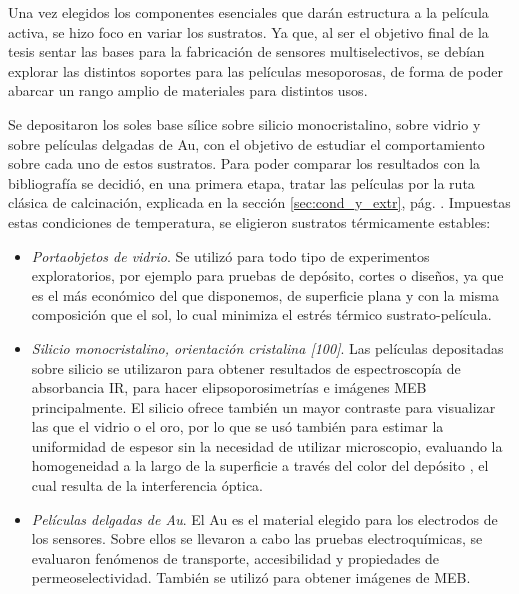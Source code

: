 	Una vez elegidos los componentes esenciales que darán estructura a la película activa, se hizo foco en variar los sustratos. Ya que, al ser el objetivo final de la tesis sentar las bases para la fabricación de sensores multiselectivos, se debían explorar las distintos soportes para las películas mesoporosas, de forma de poder abarcar un rango amplio de materiales para distintos usos.

	Se depositaron los soles base sílice sobre silicio monocristalino, sobre vidrio y sobre películas delgadas de Au, con el objetivo de estudiar el comportamiento sobre cada uno de estos sustratos. Para poder comparar los resultados con la bibliografía\cite{Soler-Illia2006,Brinker1990} se decidió, en una primera etapa, tratar las películas por la ruta clásica de calcinación, explicada en la sección \ref{sec:cond_y_extr}, pág. \pageref{sec:cond_y_extr}. Impuestas estas condiciones de temperatura, se eligieron sustratos térmicamente estables:

		\begin{itemize}

			\item \textit{Portaobjetos de vidrio}. Se utilizó para todo tipo de experimentos exploratorios, por ejemplo para pruebas de depósito, cortes o diseños, ya que es el más económico del que disponemos, de superficie plana y con la misma composición que el sol, lo cual minimiza el estrés térmico sustrato-película.

			\item \textit{Silicio monocristalino, orientación cristalina [100]}. Las películas depositadas sobre silicio se utilizaron para obtener resultados de espectroscopía de absorbancia IR, para hacer elipsoporosimetrías e imágenes MEB principalmente. El silicio ofrece también un mayor contraste para visualizar las \pdm\space que el vidrio o el oro, por lo que se usó también para estimar la uniformidad de espesor sin la necesidad de utilizar microscopio, evaluando la homogeneidad a la largo de la superficie a través del color del depósito , el cual resulta de la interferencia óptica.
		
			\item \textit{Películas delgadas de Au}. El Au es el material elegido para los electrodos de los sensores. Sobre ellos se llevaron a cabo las pruebas electroquímicas, se evaluaron fenómenos de transporte, accesibilidad y propiedades de permeoselectividad. También se utilizó para obtener imágenes de MEB. 

			\end{itemize}
	
